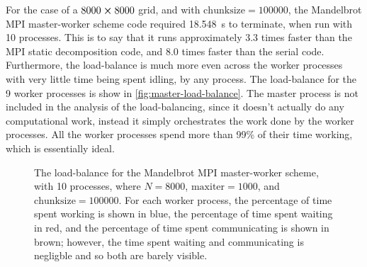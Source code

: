 \documentclass{article}
\begin{document}
For the case of a $8000 \cross 8000$ grid, and with
$\mathrm{chunksize} = 100000$, the Mandelbrot MPI master-worker scheme code
required \SI{18.548}{\second} to terminate, when run with 10 processes.
This is to say that it runs approximately 3.3 times faster than the MPI static
decomposition code, and 8.0 times faster than the serial code.
Furthermore, the load-balance is much more even across the worker processes with
very little time being spent idling, by any process.
The load-balance for the 9 worker processes is show in
\autoref{fig:master-load-balance}.
The master process is not included in the analysis of the load-balancing, since
it doesn't actually do any computational work, instead it simply orchestrates
the work done by the worker processes.
All the worker processes spend more than 99\% of their time working, which is
essentially ideal.
\begin{figure}[h]
  \centering
  \caption{The load-balance for the Mandelbrot MPI master-worker scheme,
    with 10 processes, where $N = 8000$, $\mathrm{maxiter} = 1000$, and
    $\mathrm{chunksize} = 100000$. For each worker process, the percentage of
    time spent working is shown in blue, the percentage of time spent waiting in
    red, and the percentage of time spent communicating is shown in brown;
    however, the time spent waiting and communicating is negligble and so both
    are barely visible.}
  \label{fig:master-load-balance}
\end{figure}
\end{document}
